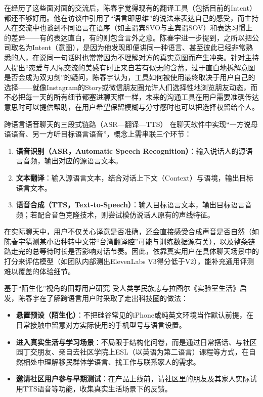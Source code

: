 \documentclass[UTF8,a4paper,11pt,fontset=fandol]{ctexart}
\begin{document}
在经历了这些面对面的交流后，陈春宇觉得现有的翻译工具（包括目前的Intent）都还不够好用。他在访谈中引用了“语言即思维”的说法来表达自己的感受，而主持人在交流中也谈到不同语言在语序（如主谓宾SVO与主宾谓SOV）和表达习惯上的差异——有的表达直白，有的则包含言外之意。陈春宇进一步提到，之所以把公司取名为Intent（意图），是因为他发现即便讲同一种语言、甚至彼此已经非常熟悉的人，在说同一句话时也常常因为不理解对方的真实意图而产生冲突。针对主持人提出“恋爱与人际交流的美感有时正来自若有似无的含蓄，过于直白地拆解意图是否会成为双刃剑”的疑问，陈春宇认为，工具如何被使用最终取决于用户自己的选择——就像Instagram的Story或微信朋友圈允许人们选择性地浏览朋友动态，而不必把每一天的所有细节都塞进聊天框一样，未来的沟通工具在用户需要准确传达意思时可以提供帮助，在用户希望保留模糊与分寸感时也可以把选择权留给个人。

\begin{knowledgebox}{跨语言语音聊天的三段式链路（ASR—翻译—TTS）}
在聊天软件中实现“一方说母语语音、另一方听目标语言语音”，概念上需串联三个环节：
\begin{enumerate}
\item \textbf{语音识别（ASR，Automatic Speech Recognition）}：输入说话人的源语言音频，输出对应的源语言文本。
\item \textbf{文本翻译}：输入源语言文本，结合对话上下文（Context）与语境，输出目标语言文本。
\item \textbf{语音合成（TTS，Text-to-Speech）}：输入目标语言文本，输出目标语言音频；若配合音色克隆技术，则尝试模仿说话人原有的声线特征。

\end{enumerate}
在实际聊天中，用户不仅关心译意是否准确，还会直接感受合成声音是否自然（如陈春宇猜测某小语种转中文带“台湾翻译腔”可能与训练数据源有关），以及整条链路走完的总等待时长是否影响对话节奏。因此，依靠真实用户在具体聊天场景中的打分来评估模型（如团队内部测出ElevenLabs V3得分低于V2），能补充通用评测难以覆盖的体验细节。
\end{knowledgebox}
\begin{importantbox}{基于“陌生化”视角的田野用户研究}
受人类学民族志与拉图尔《实验室生活》启发，陈春宇在了解跨语言用户时采取了走出科技圈的做法：
\begin{itemize}
\item \textbf{悬置预设（陌生化）}：不把硅谷常见的iPhone或纯英文环境当作默认前提，在日常接触中留意对方实际使用的手机型号与语言设置。
\item \textbf{进入真实生活与学习场景}：不局限于结构化问卷，而是通过日常搭话、与社区园丁交朋友、亲自去社区学院上ESL（以英语为第二语言）课程等方式，在自然相处中理解移民群体学语言、找工作与联系家人的需求。
\item \textbf{邀请社区用户参与早期测试}：在产品上线前，请社区里的朋友及其家人实际试用TTS语音等功能，收集真实生活场景下的反馈。
\end{itemize}
\end{importantbox}
\end{document}
